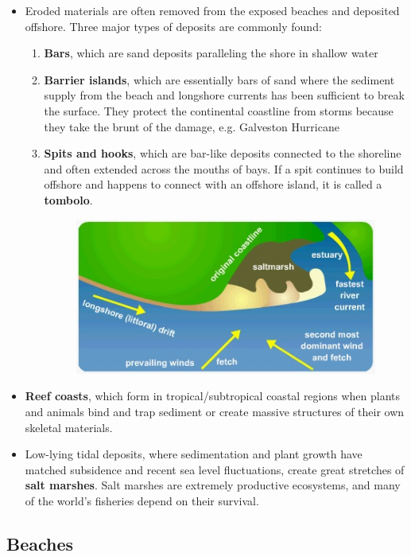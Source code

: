 \documentclass{article}
\begin{document}
	\begin{itemize}
		\item Eroded materials are often removed from the exposed beaches and deposited offshore. Three major types of deposits are commonly found:
		\begin{enumerate}
			\item \textbf{Bars}, which are sand deposits paralleling the shore in shallow water
			\item \textbf{Barrier islands}, which are essentially bars of sand where the sediment supply from the beach and longshore currents has been sufficient to break the surface. They protect the continental coastline from storms because they take the brunt of the damage, e.g. Galveston Hurricane
			\item \textbf{Spits and hooks}, which are bar-like deposits connected to the shoreline and often extended across the mouths of bays.  If a spit continues to build offshore and happens to connect with an offshore island, it is called a \textbf{tombolo}.
		\begin{figure}[H]
   		\centering
    		\includegraphics[scale=0.8]{./Images/BC6_Spit.jpg}
		\end{figure}
		\end{enumerate}

		\item \textbf{Reef coasts}, which form in tropical/subtropical coastal regions when plants and animals bind and trap sediment or create massive structures of their own skeletal materials. 
		\item Low-lying tidal deposits, where sedimentation and plant growth have matched subsidence and recent sea level fluctuations, create great stretches of \textbf{salt marshes}. Salt marshes are extremely productive ecosystems, and many of the world's fisheries depend on their survival.
	\end{itemize}
	
	\subsection{Beaches}
	
\end{document}
